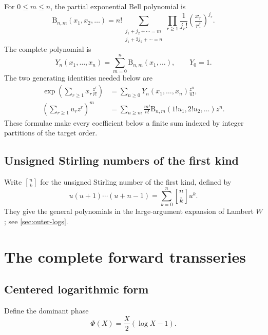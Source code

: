 \documentclass[11pt,oneside]{article}
\theoremstyle{plain}
\theoremstyle{definition}
\theoremstyle{remark}
\newcommand{\BellP}{\mathrm B}
\newcommand{\BellC}{Y}
\newcommand{\stirlingone}[2]{\genfrac{[}{]}{0pt}{}{#1}{#2}}
\begin{document}
For \(0\leq m\leq n\), the partial exponential Bell polynomial is
\begin{equation}
 \BellP_{n,m}(x_1,x_2,\ldots)
 =n!\!\sum_{\substack{j_1+j_2+\cdots=m\\
                      j_1+2j_2+\cdots=n}}
 \prod_{r\ge1}\frac1{j_r!}\left(\frac{x_r}{r!}\right)^{j_r}.
 \label{eq:partial-bell}
\end{equation}
The complete polynomial is
\begin{equation}
 \BellC_n(x_1,\ldots,x_n)=\sum_{m=0}^n\BellP_{n,m}(x_1,\ldots),
 \qquad \BellC_0=1.
 \label{eq:complete-bell}
\end{equation}
The two generating identities needed below are
\begin{align}
 \exp\!\left(\sum_{r\ge1}x_r\frac{z^r}{r!}\right)
 &=\sum_{n\ge0}\BellC_n(x_1,\ldots,x_n)\frac{z^n}{n!},
 \label{eq:complete-bell-egf}\\
 \left(\sum_{r\ge1}u_rz^r\right)^m
 &=\sum_{n\ge m}\frac{m!}{n!}
 \BellP_{n,m}(1!u_1,2!u_2,\ldots)z^n.
 \label{eq:partial-bell-power}
\end{align}
These formulae make every coefficient below a finite sum indexed by integer
partitions of the target order.

\subsection{Unsigned Stirling numbers of the first kind}

Write
\(\stirlingone{n}{k}\) for the unsigned Stirling number of the first kind,
defined by
\begin{equation}
 u(u+1)\cdots(u+n-1)=\sum_{k=0}^n\stirlingone{n}{k}u^k.
 \label{eq:stirling-first}
\end{equation}
They give the general polynomials in the large-argument expansion of Lambert
\(W\); see \cref{sec:outer-logs}.

\section{The complete forward transseries}
\label{sec:forward}

\subsection{Centered logarithmic form}

Define the dominant phase
\begin{equation}
 \Phi(X)=\frac X2(\log X-1).
 \label{eq:Phi}
\end{equation}
\end{document}
